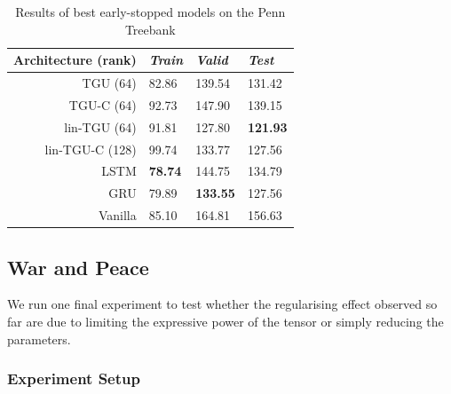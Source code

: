 \begin{table}

\begin{tabu} to \textwidth {r||l|l|l}
 Architecture (rank) & \emph{Train} & \emph{Valid} & \emph{Test} \\
\hline
TGU   (64)    & 82.86 & 139.54 & 131.42 \\
TGU-C  (64)   & 92.73 & 147.90 & 139.15 \\
lin-TGU (64)  & 91.81 & 127.80 & \textbf{121.93} \\
lin-TGU-C (128) & 99.74 & 133.77 & 127.56 \\
\hline
LSTM      & \textbf{78.74} & 144.75 & 134.79 \\
GRU       & 79.89 & \textbf{133.55} & 127.56 \\
Vanilla   & 85.10 & 164.81 & 156.63 \\
\hline
\end{tabu}

\caption{Results of best early-stopped models on the Penn Treebank}
\label{tab:ptb}
\end{table}


\subsection{War and Peace}
We run one final experiment to test whether the regularising effect
observed so far are due to limiting the expressive power of the tensor
or simply reducing the parameters.

\subsubsection{Experiment Setup}

